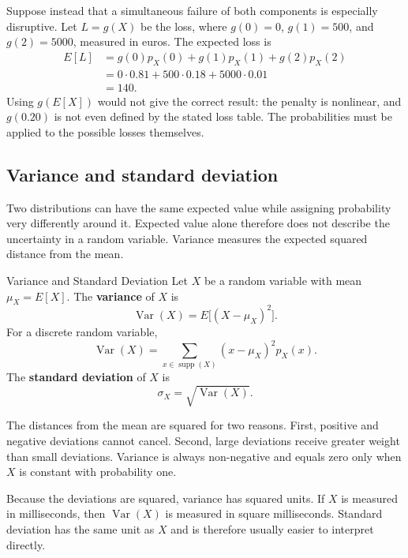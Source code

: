 \pagebreak
\begin{example}\par
Suppose instead that a simultaneous failure of both components is especially disruptive. Let $L=g(X)$ be the loss, where $g(0)=0$, $g(1)=500$, and $g(2)=5000$, measured in euros.
The expected loss is
\[
\begin{aligned}
E[L]
&=g(0)p_X(0)+g(1)p_X(1)+g(2)p_X(2)\\
&=0\cdot0.81+500\cdot0.18+5000\cdot0.01\\
&=140.
\end{aligned}
\]
Using $g(E[X])$ would not give the correct result: the penalty is nonlinear, and $g(0.20)$ is not even defined by the stated loss table. The probabilities must be applied to the possible losses themselves.
\end{example}

\subsection{Variance and standard deviation}

Two distributions can have the same expected value while assigning probability very differently around it. Expected value alone therefore does not describe the uncertainty in a random variable. Variance measures the expected squared distance from the mean.

\begin{definition}{Variance and Standard Deviation}
    Let $X$ be a random variable with mean $\mu_X=E[X]$. The \textbf{variance} of $X$ is
    \[
    \operatorname{Var}(X)
    =E\big[(X-\mu_X)^2\big].
    \]
    For a discrete random variable,
    \[
    \operatorname{Var}(X)
    =\sum_{x\in\operatorname{supp}(X)}(x-\mu_X)^2p_X(x).
    \]
    The \textbf{standard deviation} of $X$ is
    \[
    \sigma_X=\sqrt{\operatorname{Var}(X)}.
    \]
\end{definition}

The distances from the mean are squared for two reasons. First, positive and negative deviations cannot cancel. Second, large deviations receive greater weight than small deviations. Variance is always non-negative and equals zero only when $X$ is constant with probability one.

Because the deviations are squared, variance has squared units. If $X$ is measured in milliseconds, then $\operatorname{Var}(X)$ is measured in square milliseconds. Standard deviation has the same unit as $X$ and is therefore usually easier to interpret directly.

